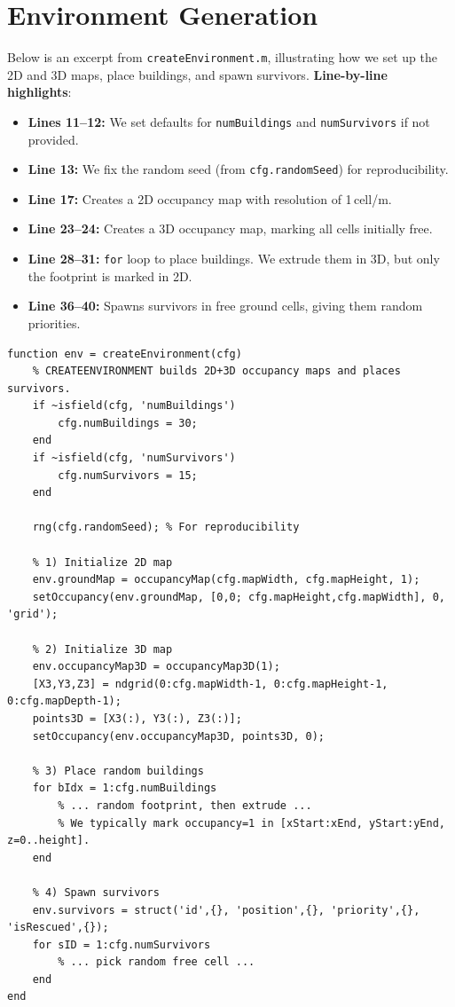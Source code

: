 \documentclass[12pt,a4paper]{report}
\begin{document}
\section{Environment Generation}
\label{sec:env_generation}
Below is an excerpt from \texttt{createEnvironment.m}, illustrating how we set up
the 2D and 3D maps, place buildings, and spawn survivors. 
\textbf{Line-by-line highlights}:
\begin{itemize}
  \item \textbf{Lines 11--12:} We set defaults for \texttt{numBuildings} and \texttt{numSurvivors} if not provided.
  \item \textbf{Line 13:} We fix the random seed (from \texttt{cfg.randomSeed}) for reproducibility.
  \item \textbf{Line 17:} Creates a 2D occupancy map with resolution of 1\,cell/m.
  \item \textbf{Line 23--24:} Creates a 3D occupancy map, marking all cells initially free.
  \item \textbf{Line 28--31:} \texttt{for} loop to place buildings. We extrude them in 3D, 
  but only the footprint is marked in 2D.
  \item \textbf{Line 36--40:} Spawns survivors in free ground cells, giving them random priorities.
\end{itemize}

\begin{verbatim}
function env = createEnvironment(cfg)
    % CREATEENVIRONMENT builds 2D+3D occupancy maps and places survivors.
    if ~isfield(cfg, 'numBuildings')
        cfg.numBuildings = 30;
    end
    if ~isfield(cfg, 'numSurvivors')
        cfg.numSurvivors = 15;
    end

    rng(cfg.randomSeed); % For reproducibility

    % 1) Initialize 2D map
    env.groundMap = occupancyMap(cfg.mapWidth, cfg.mapHeight, 1);
    setOccupancy(env.groundMap, [0,0; cfg.mapHeight,cfg.mapWidth], 0, 'grid');

    % 2) Initialize 3D map
    env.occupancyMap3D = occupancyMap3D(1);
    [X3,Y3,Z3] = ndgrid(0:cfg.mapWidth-1, 0:cfg.mapHeight-1, 0:cfg.mapDepth-1);
    points3D = [X3(:), Y3(:), Z3(:)];
    setOccupancy(env.occupancyMap3D, points3D, 0);

    % 3) Place random buildings
    for bIdx = 1:cfg.numBuildings
        % ... random footprint, then extrude ...
        % We typically mark occupancy=1 in [xStart:xEnd, yStart:yEnd, z=0..height].
    end

    % 4) Spawn survivors
    env.survivors = struct('id',{}, 'position',{}, 'priority',{}, 'isRescued',{});
    for sID = 1:cfg.numSurvivors
        % ... pick random free cell ...
    end
end
\end{verbatim}
\end{document}
